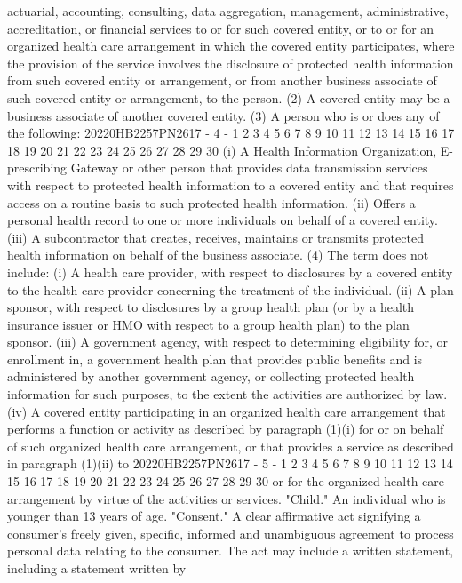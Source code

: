 actuarial, accounting, consulting, data aggregation,
management, administrative, accreditation, or financial
services to or for such covered entity, or to or for an
organized health care arrangement in which the covered
entity participates, where the provision of the service
involves the disclosure of protected health information
from such covered entity or arrangement, or from another
business associate of such covered entity or arrangement,
to the person.
(2) A covered entity may be a business associate of
another covered entity.
(3) A person who is or does any of the following:
20220HB2257PN2617 - 4 -
1
2
3
4
5
6
7
8
9
10
11
12
13
14
15
16
17
18
19
20
21
22
23
24
25
26
27
28
29
30
(i) A Health Information Organization, E-prescribing
Gateway or other person that provides data transmission
services with respect to protected health information to
a covered entity and that requires access on a routine
basis to such protected health information.
(ii) Offers a personal health record to one or more
individuals on behalf of a covered entity.
(iii) A subcontractor that creates, receives,
maintains or transmits protected health information on
behalf of the business associate.
(4) The term does not include:
(i) A health care provider, with respect to
disclosures by a covered entity to the health care
provider concerning the treatment of the individual.
(ii) A plan sponsor, with respect to disclosures by
a group health plan (or by a health insurance issuer or
HMO with respect to a group health plan) to the plan
sponsor.
(iii) A government agency, with respect to
determining eligibility for, or enrollment in, a
government health plan that provides public benefits and
is administered by another government agency, or
collecting protected health information for such
purposes, to the extent the activities are authorized by
law.
(iv) A covered entity participating in an organized
health care arrangement that performs a function or
activity as described by paragraph (1)(i) for or on
behalf of such organized health care arrangement, or that
provides a service as described in paragraph (1)(ii) to
20220HB2257PN2617 - 5 -
1
2
3
4
5
6
7
8
9
10
11
12
13
14
15
16
17
18
19
20
21
22
23
24
25
26
27
28
29
30
or for the organized health care arrangement by virtue of
the activities or services.
"Child." An individual who is younger than 13 years of age.
"Consent." A clear affirmative act signifying a consumer's
freely given, specific, informed and unambiguous agreement to
process personal data relating to the consumer. The act may
include a written statement, including a statement written by
